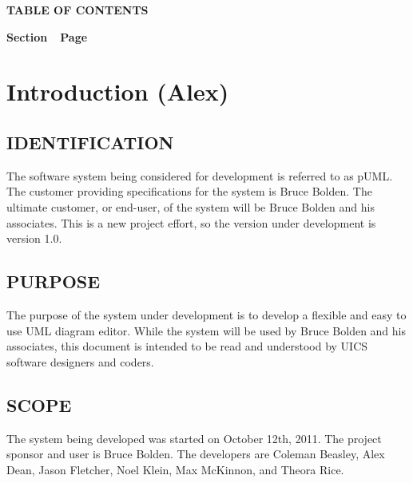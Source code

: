 \documentclass[twoside,letterpaper]{article}
\begin{document}
{\centering{}\bfseries\color{black}
TABLE OF CONTENTS
\par}


\bigskip

{\bfseries\color{black}
Section\ \ Page}

\setcounter{tocdepth}{9}
\renewcommand\contentsname{}
\tableofcontents

\bigskip

\clearpage\clearpage\setcounter{page}{1}\pagestyle{Convertii}
\section[Introduction (Alex)]{\rmfamily\bfseries\color{black}
Introduction (Alex)}
{\color{black}


\subsection[IDENTIFICATION]{\rmfamily\bfseries\color{black}
IDENTIFICATION}


{\color{black}
	The software system being considered for development is referred to as pUML.	The customer providing specifications for the system is Bruce Bolden. The ultimate customer, or end-user, of the system will be Bruce Bolden and his associates. This is a new project effort, so the version under development is version 1.0.
}

\subsection[PURPOSE]{\rmfamily\bfseries\color{black}
PURPOSE}


{\color{black}
	The purpose of the system under development is to develop a flexible and easy to use UML diagram editor.	While the system will be used by Bruce Bolden and his associates, this document is intended to be read and understood by UICS software designers and coders.}

\subsection[SCOPE]{\rmfamily\bfseries\color{black}
SCOPE}

{\color{black}
	The system being developed was started on October 12th, 2011.  The project sponsor and user is Bruce Bolden.  The developers are Coleman Beasley, Alex Dean, Jason Fletcher, Noel Klein, Max McKinnon, and Theora Rice.}

}
\end{document}
